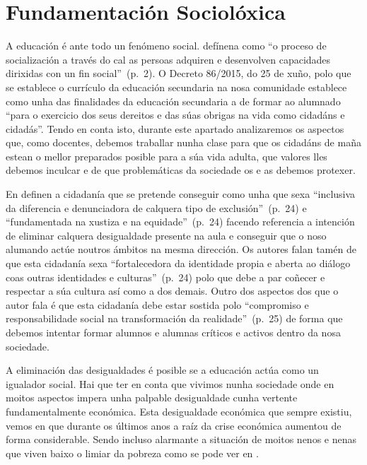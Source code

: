 
\section{Fundamentación Sociolóxica}

A educación é ante todo un fenómeno social.  defínena como ``o proceso de socialización a través do cal as persoas adquiren e desenvolven capacidades dirixidas con un fin social''~(p.~2). O Decreto 86/2015, do 25 de xuño, polo que se establece o currículo da educación secundaria na nosa comunidade establece como unha das finalidades da educación secundaria a de formar ao alumnado ``para o exercicio dos seus dereitos e das súas obrigas na vida como cidadáns e cidadás''. Tendo en conta isto, durante este apartado analizaremos os aspectos que, como docentes, debemos traballar nunha clase para que os cidadáns de maña estean o mellor preparados posible para a súa vida adulta, que valores lles debemos inculcar e de que problemáticas da sociedade os e as debemos protexer.

En  definen a cidadanía que se pretende conseguir como unha que sexa ``inclusiva da diferencia e denunciadora de calquera tipo de exclusión''~(p.~24) e ``fundamentada na xustiza e na equidade''~(p.~24) facendo referencia a intención de eliminar calquera desigualdade presente na aula e conseguir que o noso alumando actúe noutros ámbitos na mesma dirección. Os autores falan tamén de que esta cidadanía sexa ``fortalecedora da identidade propia e aberta ao diálogo coas outras identidades e culturas''~(p.~24) polo que debe a par coñecer e respectar a súa cultura así como a dos demais. Outro dos aspectos dos que o autor fala é que esta cidadanía debe estar sostida polo ``compromiso e responsabilidade social na transformación da realidade''~(p.~25) de forma que debemos intentar formar alumnos e alumnas críticos e activos dentro da nosa sociedade.

A eliminación das desigualdades é posible se a educación actúa como un igualador social. Hai que ter en conta que vivimos nunha sociedade onde en moitos aspectos impera unha palpable desigualdade cunha vertente fundamentalmente económica. Esta desigualdade económica que sempre existiu, vemos en  que durante os últimos anos a raíz da crise económica aumentou de forma considerable. Sendo incluso alarmante a situación de moitos nenos e nenas que viven baixo o limiar da pobreza como se pode ver en .

